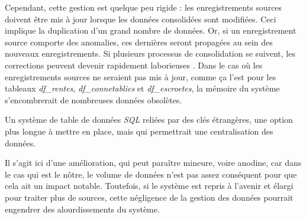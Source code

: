 Cependant, cette gestion est quelque peu rigide :  les enregistrements sources doivent être mis à jour lorsque les données consolidées sont modifiées. Ceci implique la duplication d'un grand nombre de données. Or, si un enregistrement source comporte des anomalies, ces dernières seront propagées au sein des nouveaux enregistrements. Si plusieurs processus de consolidation se suivent,  les corrections peuvent devenir rapidement laborieuses \parencite{boydens_qualite_2021}. Dans le cas où  les enregistrements sources ne seraient pas mis à jour, comme ça l'est pour les tableaux  \textit{df\_rentes}, \textit{df\_connetablies} et \textit{df\_escroetes}, la mémoire du système s'encombrerait de nombreuses données obsolètes.

Un système de table de données \textit{SQL}  reliées par des clés étrangères, une option plus longue à mettre en place, mais qui permettrait une centralisation des données. 

Il s'agit ici d'une amélioration, qui peut paraître mineure, voire anodine, car dans le cas qui est le nôtre, le volume de données n'est pas assez conséquent pour que cela ait un impact notable. Toutefois, si le système est repris à l'avenir et élargi pour traiter plus de sources, cette négligence de la gestion des données pourrait engendrer des alourdissements du système.

